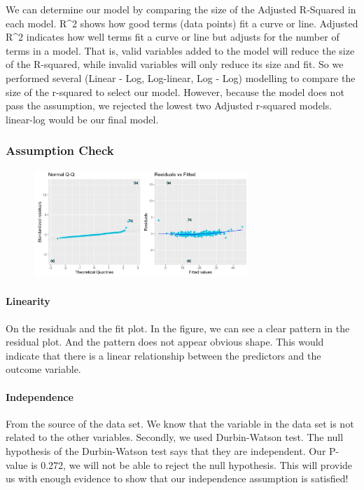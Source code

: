 \documentclass[letterpaper,9pt,twocolumn,twoside,]{pinp}
\begin{document}
We can determine our model by comparing the size of the Adjusted
R-Squared in each model. R\^{}2 shows how good terms (data points) fit a
curve or line. Adjusted R\^{}2 indicates how well terms fit a curve or
line but adjusts for the number of terms in a model. That is, valid
variables added to the model will reduce the size of the R-squared,
while invalid variables will only reduce its size and fit. So we
performed several (Linear - Log, Log-linear, Log - Log) modelling to
compare the size of the r-squared to select our model. However, because
the model does not pass the assumption, we rejected the lowest two
Adjusted r-squared models. linear-log would be our final model.

\hypertarget{assumption-check}{%
\subsubsection{Assumption Check}\label{assumption-check}}

\begin{figure}[hbt!]
  \includegraphics[width=3.2in, height=1.6in]{abcd} 
\end{figure}

\hypertarget{linearity}{%
\paragraph{Linearity}\label{linearity}}

On the residuals and the fit plot. In the figure, we can see a clear
pattern in the residual plot. And the pattern does not appear obvious
shape. This would indicate that there is a linear relationship between
the predictors and the outcome variable.

\hypertarget{independence}{%
\paragraph{Independence}\label{independence}}

From the source of the data set. We know that the variable in the data
set is not related to the other variables. Secondly, we used
Durbin-Watson test. The null hypothesis of the Durbin-Watson test says
that they are independent. Our P-value is 0.272, we will not be able to
reject the null hypothesis. This will provide us with enough evidence to
show that our independence assumption is satisfied!
\end{document}
